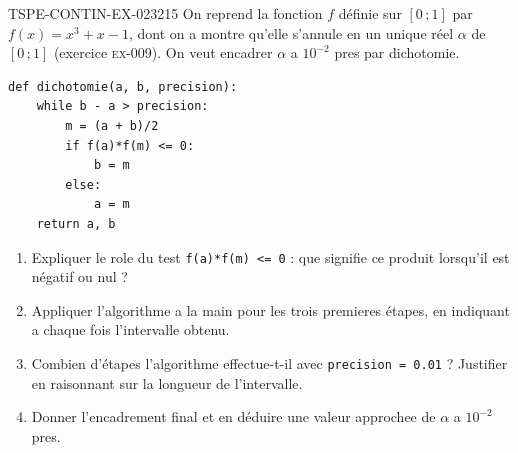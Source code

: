 \begin{exercice}{TSPE-CONTIN-EX-023}{2}{15}
On reprend la fonction $f$ définie sur $[0\,;1]$ par $f(x) = x^3 + x - 1$, dont on a montre qu'elle s'annule en un unique réel $\alpha$ de $[0\,;1]$ (exercice \textsc{ex-009}). On veut encadrer $\alpha$ a $10^{-2}$ pres par dichotomie.

\begin{center}
\begin{minipage}{0.8\linewidth}
\begin{verbatim}
def dichotomie(a, b, precision):
    while b - a > precision:
        m = (a + b)/2
        if f(a)*f(m) <= 0:
            b = m
        else:
            a = m
    return a, b
\end{verbatim}
\end{minipage}
\end{center}

\begin{enumerate}
  \item Expliquer le role du test \verb|f(a)*f(m) <= 0| : que signifie ce produit lorsqu'il est négatif ou nul ?
  \item Appliquer l'algorithme a la main pour les trois premieres étapes, en indiquant a chaque fois l'intervalle obtenu.
  \item Combien d'étapes l'algorithme effectue-t-il avec \verb|precision = 0.01| ? Justifier en raisonnant sur la longueur de l'intervalle.
  \item Donner l'encadrement final et en déduire une valeur approchee de $\alpha$ a $10^{-2}$ pres.
\end{enumerate}
\end{exercice}
